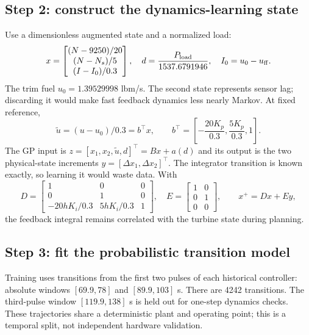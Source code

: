 \subsection{Step 2: construct the dynamics-learning state}
Use a dimensionless augmented state and a normalized load:
\begin{equation}
 x=\begin{bmatrix}(N-9250)/20\\(N-N_s)/5\\(I-I_0)/0.3\end{bmatrix},\quad
 d=\frac{P_{\rm load}}{1537.6791946},\quad I_0=u_0-u_{\rm ff}.
\end{equation}
The trim fuel $u_0=1.39529998$ lbm/s. The second state represents sensor lag; discarding it would make fast feedback dynamics less nearly Markov. At fixed reference,
\begin{equation}
 \tilde u=(u-u_0)/0.3=b^\top x,\qquad
 b^\top=\left[-\frac{20K_p}{0.3},\frac{5K_p}{0.3},1\right].
\end{equation}
The GP input is $z=[x_1,x_2,\tilde u,d]^\top=B x+a(d)$ and its output is the two physical-state increments $y=[\Delta x_1,\Delta x_2]^\top$. The integrator transition is known exactly, so learning it would waste data. With
\begin{equation}
 D=\begin{bmatrix}1&0&0\\0&1&0\\-20hK_i/0.3&5hK_i/0.3&1\end{bmatrix},\quad
 E=\begin{bmatrix}1&0\\0&1\\0&0\end{bmatrix},\qquad x^+=Dx+Ey,
\end{equation}
the feedback integral remains correlated with the turbine state during planning.

\subsection{Step 3: fit the probabilistic transition model}
Training uses transitions from the first two pulses of each historical controller: absolute windows $[69.9,78]$ and $[89.9,103]$ s. There are 4242 transitions. The third-pulse window $[119.9,138]$ s is held out for one-step dynamics checks. These trajectories share a deterministic plant and operating point; this is a temporal split, not independent hardware validation.


